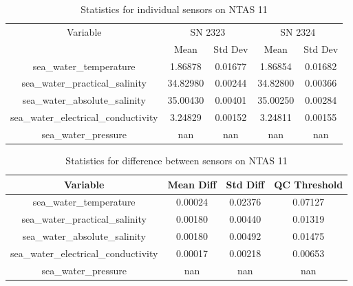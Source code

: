 \begin{table}[h]
\centering
\begin{tabular}{|c|c|c|c|c|}
\hline
Variable & \multicolumn{2}{c|}{SN 2323} & \multicolumn{2}{c|}{SN 2324} \\
& Mean & Std Dev & Mean & Std Dev \\
\hline
sea\_water\_temperature & 1.86878 & 0.01677 & 1.86854 & 0.01682 \\
sea\_water\_practical\_salinity & 34.82980 & 0.00244 & 34.82800 & 0.00366 \\
sea\_water\_absolute\_salinity & 35.00430 & 0.00401 & 35.00250 & 0.00284 \\
sea\_water\_electrical\_conductivity & 3.24829 & 0.00152 & 3.24811 & 0.00155 \\
sea\_water\_pressure & nan & nan & nan & nan \\
\hline
\end{tabular}
\caption{Statistics for individual sensors on NTAS 11}
\end{table}

\begin{table}[h]
\centering
\begin{tabular}{|c|c|c|c|}
\hline
Variable & Mean Diff & Std Diff & QC Threshold \\
\hline
sea\_water\_temperature & 0.00024 & 0.02376 & 0.07127 \\
sea\_water\_practical\_salinity & 0.00180 & 0.00440 & 0.01319 \\
sea\_water\_absolute\_salinity & 0.00180 & 0.00492 & 0.01475 \\
sea\_water\_electrical\_conductivity & 0.00017 & 0.00218 & 0.00653 \\
sea\_water\_pressure & nan & nan & nan \\
\hline
\end{tabular}
\caption{Statistics for difference between sensors on NTAS 11}
\end{table}
